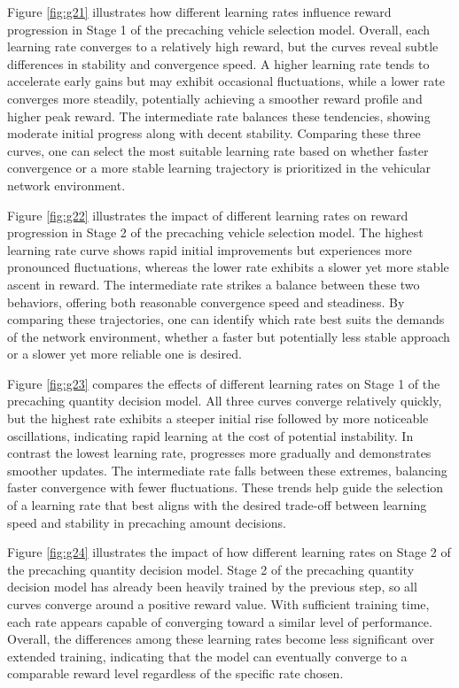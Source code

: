 \documentclass{aims}
\numberwithin{equation}{section}
\begin{document}
Figure \ref{fig:g21} illustrates how different learning rates influence reward progression in Stage 1 of the precaching vehicle selection model.
Overall, each learning rate converges to a relatively high reward, but the curves reveal subtle differences in stability and convergence speed.
A higher learning rate tends to accelerate early gains but may exhibit occasional fluctuations, while a lower rate converges more steadily, potentially achieving a smoother reward profile and higher peak reward.
The intermediate rate balances these tendencies, showing moderate initial progress along with decent stability.
Comparing these three curves, one can select the most suitable learning rate based on whether faster convergence or a more stable learning trajectory is prioritized in the vehicular network environment.

Figure \ref{fig:g22} illustrates the impact of different learning rates on reward progression in Stage 2 of the precaching vehicle selection model.
The highest learning rate curve shows rapid initial improvements but experiences more pronounced fluctuations, whereas the lower rate exhibits a slower yet more stable ascent in reward.
The intermediate rate strikes a balance between these two behaviors, offering both reasonable convergence speed and steadiness.
By comparing these trajectories, one can identify which rate best suits the demands of the network environment, whether a faster but potentially less stable approach or a slower yet more reliable one is desired.

Figure \ref{fig:g23} compares the effects of different learning rates on Stage 1 of the precaching quantity decision model.
All three curves converge relatively quickly, but the highest rate exhibits a steeper initial rise followed by more noticeable oscillations, indicating rapid learning at the cost of potential instability.
In contrast the lowest learning rate, progresses more gradually and demonstrates smoother updates.
The intermediate rate falls between these extremes, balancing faster convergence with fewer fluctuations.
These trends help guide the selection of a learning rate that best aligns with the desired trade-off between learning speed and stability in precaching amount decisions.

Figure \ref{fig:g24} illustrates the impact of how different learning rates on Stage 2 of the precaching quantity decision model.
Stage 2 of the precaching quantity decision model has already been heavily trained by the previous step, so all curves converge around a positive reward value.
With sufficient training time, each rate appears capable of converging toward a similar level of performance.
Overall, the differences among these learning rates become less significant over extended training, indicating that the model can eventually converge to a comparable reward level regardless of the specific rate chosen.
\end{document}
